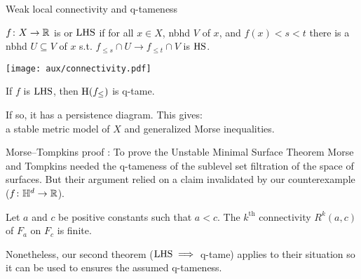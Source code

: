 \begin{frame}{Weak local connectivity and q-tameness}
	\pause
	\begin{minipage}{0.5\textwidth}
		$f \colon X \to \mathbb{R}$ is  or $\mathrm{LHS}$ if for all $x \in X$, nbhd $V$ of $x$, and $f(x) < s < t$ there is a nbhd $U \subseteq V$ of $x$ s.t. $f_{\leq s} \cap U \to f_{\leq t} \cap V$ is $\mathrm{HS}$.
	\end{minipage}
	\begin{minipage}{0.4\textwidth}
		\hspace*{.5cm}\texttt{[image: aux/connectivity.pdf]}
	\end{minipage}

	\bigskip\pause

	\begin{theorem}[BMS 2021]
		If $f$ is $\mathrm{LHS}$, then $\mathrm{H}(f_{\le})$ is q-tame.
	\end{theorem}

	\smallskip\pause
	If so, it has a persistence diagram.
	This gives: \\
	a stable metric model of $X$ and generalized Morse inequalities.
\end{frame}

\begin{frame}{Morse--Tompkins proof}
	: To prove the Unstable Minimal Surface Theorem Morse and Tompkins needed the q-tameness of the sublevel set filtration of the space of surfaces.
	But their argument relied on a claim invalidated by our counterexample ($f \colon \mathbb{H}^d \to \mathbb{R}$).

	\begin{displayquote}[Morse 1940]
		Let $a$ and $c$ be positive constants such that $a < c$.
		The $k^{\mathrm{th}}$ connectivity $R^k(a,c)$ of $F_a$ on $F_c$ is finite.
	\end{displayquote}

	Nonetheless, our second theorem ($\mathrm{LHS} \implies$ q-tame) applies to their situation so it can be used to ensures the assumed q-tameness.
\end{frame}

